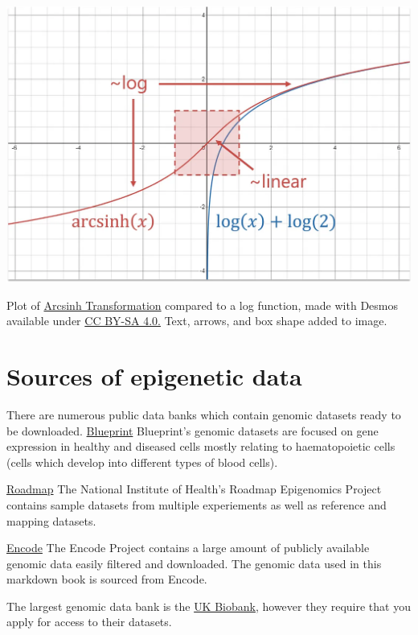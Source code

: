 \documentclass[
]{book}
\begin{document}
\includegraphics{images/arcsinh.png}

Plot of \href{https://miro.medium.com/v2/resize:fit:1100/format:webp/1*glJtHk1HRZpYHsk79QxgwQ.png}{Arcsinh Transformation} compared to a log function, made with Desmos available under \href{https://miro.medium.com/v2/resize:fit:1100/format:webp/1*glJtHk1HRZpYHsk79QxgwQ.png}{CC BY-SA 4.0.} Text, arrows, and box shape added to image.

\section{Sources of epigenetic data}\label{sources-of-epigenetic-data}

There are numerous public data banks which contain genomic datasets ready to be downloaded.
\href{https://projects.ensembl.org/blueprint/}{Blueprint}
Blueprint's genomic datasets are focused on gene expression in healthy and diseased cells mostly relating to haematopoietic cells (cells which develop into different types of blood cells).

\href{https://www.ncbi.nlm.nih.gov/geo/roadmap/epigenomics/}{Roadmap}
The National Institute of Health's Roadmap Epigenomics Project contains sample datasets from multiple experiements as well as reference and mapping datasets.

\href{https://www.encodeproject.org/}{Encode}
The Encode Project contains a large amount of publicly available genomic data easily filtered and downloaded. The genomic data used in this markdown book is sourced from Encode.

The largest genomic data bank is the \href{https://www.ukbiobank.ac.uk/}{UK Biobank}, however they require that you apply for access to their datasets.
\end{document}
